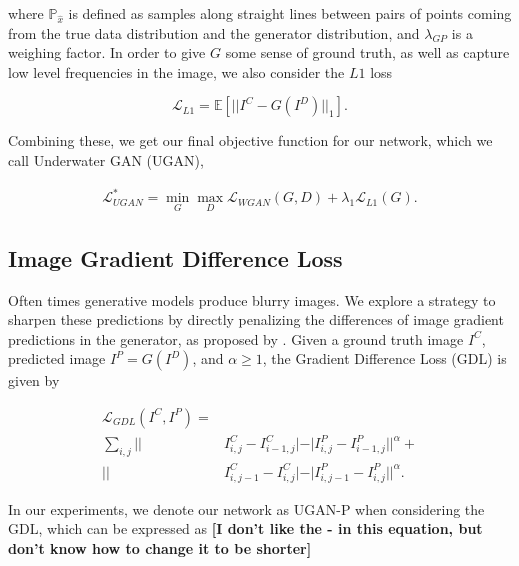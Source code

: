 \documentclass[letterpaper, 10pt, conference]{ieeeconf}
\newcommand{\marginlabel}[1]{\mbox{}\marginpar[\raggedleft\hspace{0pt}{#1}]{
\raggedright\hspace{0pt}{#1}}}
\newcommand{\starnote}[1]{\marginlabel{$\bigstar$}\textbf{[#1]}}
\begin{document}
\noindent where $\mathbb{P}_{\hat{x}}$ is defined as samples along straight lines between pairs of points coming from
the true data distribution and the generator distribution, and $\lambda_{GP}$ is a weighing factor. In order to give $G$
some sense of ground truth, as well as capture low level frequencies in the image, we also consider the $L1$ loss

\begin{equation}
   \mathcal{L}_{L1} = \mathbb{E} [ || I^C - G(I^D) ||_1 ].
\end{equation}

\noindent Combining these, we get our final objective function for our network, which we call Underwater GAN (UGAN),

\begin{equation}
   \begin{aligned}
      \mathcal{L}_{UGAN}^* = \min\limits_{G}\max\limits_{D} \mathcal{L}_{WGAN}(G,D) + \lambda_{1} \mathcal{L}_{L1}(G).
   \end{aligned}
\end{equation}


\subsection{Image Gradient Difference Loss}
Often times generative models produce blurry images. We explore a strategy to sharpen these predictions by
directly penalizing the differences of image gradient predictions in the generator, as proposed by
\cite{mathieu2015deep}. Given a ground truth image $I^C$, predicted image $I^P = G(I^D)$, and $\alpha \geq 1$, the
Gradient Difference Loss (GDL) is given by

\begin{equation}
   \begin{aligned}
      \mathcal{L}_{GDL}(I^C, I^P) = \\ \sum\limits_{i,j} || & I^C_{i,j} - I^C_{i-1,j}| - | I^P_{i,j} - I^P_{i-1,j}||^{\alpha} + \\
      || & I^C_{i,j-1} - I^C_{i,j}| - | I^P_{i,j-1} - I^P_{i,j}||^{\alpha}.
   \end{aligned}
   \label{gdl_eq}
\end{equation}

\noindent In our experiments, we denote our network as UGAN-P when considering the GDL, which can be expressed as
\starnote{I don't like the - in this equation, but don't know how to change it to be shorter}
\end{document}
